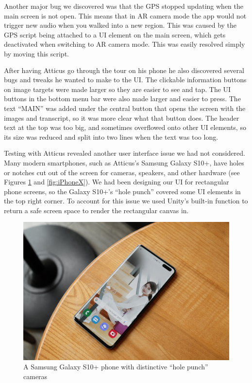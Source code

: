 \documentclass[a4paper, 10pt, american, titlepage]{article}
\begin{document}
Another major bug we discovered was that the GPS stopped updating when the main
screen is not open. This means that in AR camera mode the app would not trigger
new audio when you walked into a new region. This was caused by the GPS script
being attached to a UI element on the main screen, which gets deactivated when
switching to AR camera mode. This was easily resolved simply by moving this
script.

After having Atticus go through the tour on his phone he also discovered several
bugs and tweaks he wanted to make to the UI. The clickable information buttons
on image targets were made larger so they are easier to see and tap. The UI
buttons in the bottom menu bar were also made larger and easier to press. The
text ``MAIN'' was added under the central button that opens the screen with the
images and transcript, so it was more clear what that button does. The header
text at the top was too big, and sometimes overflowed onto other UI elements, so
its size was reduced and split into two lines when the text was too long.

Testing with Atticus revealed another user interface issue we had not
considered.  Many modern smartphones, such as Atticus's Samsung Galaxy S10+,
have holes or notches cut out of the screen for cameras, speakers, and other
hardware (see Figures \ref{fig:galaxyS10Plus} and \ref{fig:iPhoneX}). We had
been designing our UI for rectangular phone screens, so the Galaxy S10+'s ``hole
punch'' covered some UI elements in the top right corner. To account for this
issue we used Unity's built-in function to return a safe screen space to render
the rectangular canvas in.

\begin{figure}[h]
	\centering
	\includegraphics[width=\textwidth]{galaxy-s10+.jpg}
	\caption[A Samsung Galaxy S10+ phone with distinctive ``hole punch''
	cameras]{A Samsung Galaxy S10+ phone with distinctive ``hole punch''
		cameras~\autocite{yoo2019}}
	\label{fig:galaxyS10Plus}
\end{figure}
\end{document}
